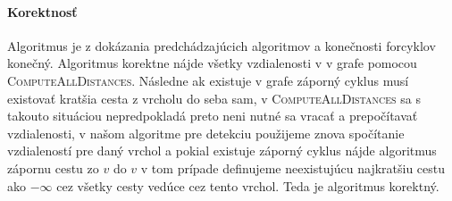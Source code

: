 \documentclass[12pt]{iv003}
\begin{document}
\paragraph{Korektnosť} Algoritmus je z dokázania predchádzajúcich algoritmov a konečnosti forcyklov konečný. Algoritmus korektne nájde všetky vzdialenosti v v grafe pomocou \textsc{ComputeAllDistances}. Následne ak existuje v grafe záporný cyklus musí existovať kratšia cesta z vrcholu do seba sam, v \textsc{ComputeAllDistances} sa s takouto situáciou nepredpokladá preto neni nutné sa vracať a prepočítavať vzdialenosti, v našom algoritme pre detekciu použijeme znova spočítanie vzdialeností pre daný vrchol a pokial existuje záporný cyklus nájde algoritmus zápornu cestu zo $v$ do $v$ v tom prípade definujeme neexistujúcu najkratšiu cestu ako $-\infty$ cez všetky cesty vedúce cez tento vrchol. Teda je algoritmus korektný.
\end{document}
